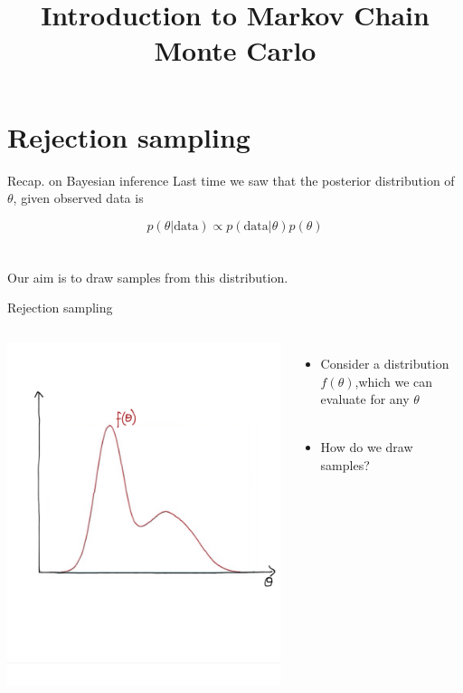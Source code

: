 \documentclass[compress]{beamer}
\title{Introduction to Markov Chain Monte Carlo}
\date{}
\begin{document}
\begin{frame}
\titlepage
\end{frame}

\section{Rejection sampling}
\label{sec-5}
\begin{frame}[label=sec-5-1]{Recap. on Bayesian inference}
Last time we saw that the \alert{posterior distribution} of $\theta$, given observed data is

$$ p(\theta | \text{data}) \propto p(\text{data}|\theta) p(\theta)$$\\~\\

Our aim is to draw samples from this distribution.
\end{frame}

\begin{frame}[label=sec-5-2]{Rejection sampling}
\begin{columns}[c] 
\includegraphics[width=1\linewidth]{RS1}

\begin{itemize}
\item Consider a distribution $f(\theta)$,which we can evaluate for any $\theta$\\~\\
\item How do we draw samples?
\end{itemize}
\end{columns}
\end{frame}
\end{document}
